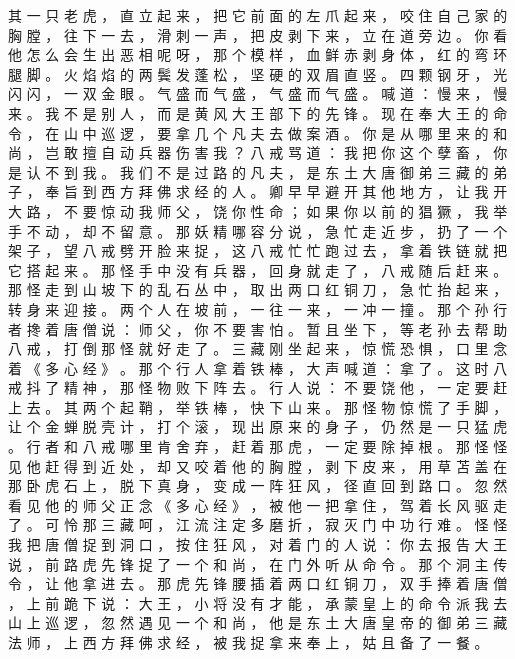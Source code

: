 {其 一 只 老 虎 ， 直 立 起 来 ， 把 它 前 面 的 左 爪 起 来 ， 咬 住 自 己 家 的 胸 膛 ， 往 下 一 去 ， 滑 刺 一 声 ， 把 皮 剥 下 来 ， 立 在 道 旁 边 。
你 看 他 怎 么 会 生 出 恶 相 呢 呀 ， 那 个 模 样 ， 血 鲜 赤 剥 身 体 ， 红 的 弯 环 腿 脚 。
火 焰 焰 的 两 鬓 发 蓬 松 ， 坚 硬 的 双 眉 直 竖 。
四 颗 钢 牙 ， 光 闪 闪 ， 一 双 金 眼 。
气 盛 而 气 盛 ， 气 盛 而 气 盛 。
喊 道 ： 慢 来 ， 慢 来 。
我 不 是 别 人 ， 而 是 黄 风 大 王 部 下 的 先 锋 。
现 在 奉 大 王 的 命 令 ， 在 山 中 巡 逻 ， 要 拿 几 个 凡 夫 去 做 案 酒 。
你 是 从 哪 里 来 的 和 尚 ， 岂 敢 擅 自 动 兵 器 伤 害 我 ？ 八 戒 骂 道 ： 我 把 你 这 个 孽 畜 ， 你 是 认 不 到 我 。
我 们 不 是 过 路 的 凡 夫 ， 是 东 土 大 唐 御 弟 三 藏 的 弟 子 ， 奉 旨 到 西 方 拜 佛 求 经 的 人 。
卿 早 早 避 开 其 他 地 方 ， 让 我 开 大 路 ， 不 要 惊 动 我 师 父 ， 饶 你 性 命 ； 如 果 你 以 前 的 猖 獗 ， 我 举 手 不 动 ， 却 不 留 意 。
那 妖 精 哪 容 分 说 ， 急 忙 走 近 步 ， 扔 了 一 个 架 子 ， 望 八 戒 劈 开 脸 来 捉 ， 这 八 戒 忙 忙 跑 过 去 ， 拿 着 铁 链 就 把 它 搭 起 来 。
那 怪 手 中 没 有 兵 器 ， 回 身 就 走 了 ， 八 戒 随 后 赶 来 。 那 怪 走 到 山 坡 下 的 乱 石 丛 中 ， 取 出 两 口 红 铜 刀 ， 急 忙 抬 起 来 ， 转 身 来 迎 接 。
两 个 人 在 坡 前 ， 一 往 一 来 ， 一 冲 一 撞 。
那 个 孙 行 者 搀 着 唐 僧 说 ： 师 父 ， 你 不 要 害 怕 。
暂 且 坐 下 ， 等 老 孙 去 帮 助 八 戒 ， 打 倒 那 怪 就 好 走 了 。
三 藏 刚 坐 起 来 ， 惊 慌 恐 惧 ， 口 里 念 着 《 多 心 经 》 。
那 个 行 人 拿 着 铁 棒 ， 大 声 喊 道 ： 拿 了 。 这 时 八 戒 抖 了 精 神 ， 那 怪 物 败 下 阵 去 。
行 人 说 ： 不 要 饶 他 ， 一 定 要 赶 上 去 。
其 两 个 起 鞘 ， 举 铁 棒 ， 快 下 山 来 。
那 怪 物 惊 慌 了 手 脚 ， 让 个 金 蝉 脱 壳 计 ， 打 个 滚 ， 现 出 原 来 的 身 子 ， 仍 然 是 一 只 猛 虎 。
行 者 和 八 戒 哪 里 肯 舍 弃 ， 赶 着 那 虎 ， 一 定 要 除 掉 根 。
那 怪 怪 见 他 赶 得 到 近 处 ， 却 又 咬 着 他 的 胸 膛 ， 剥 下 皮 来 ， 用 草 苫 盖 在 那 卧 虎 石 上 ， 脱 下 真 身 ， 变 成 一 阵 狂 风 ， 径 直 回 到 路 口 。
忽 然 看 见 他 的 师 父 正 念 《 多 心 经 》 ， 被 他 一 把 拿 住 ， 驾 着 长 风 驱 走 了 。
可 怜 那 三 藏 呵 ， 江 流 注 定 多 磨 折 ， 寂 灭 门 中 功 行 难 。
怪 怪 我 把 唐 僧 捉 到 洞 口 ， 按 住 狂 风 ， 对 着 门 的 人 说 ： 你 去 报 告 大 王 说 ， 前 路 虎 先 锋 捉 了 一 个 和 尚 ， 在 门 外 听 从 命 令 。
那 个 洞 主 传 令 ， 让 他 拿 进 去 。
那 虎 先 锋 腰 插 着 两 口 红 铜 刀 ， 双 手 捧 着 唐 僧 ， 上 前 跪 下 说 ： 大 王 ， 小 将 没 有 才 能 ， 承 蒙 皇 上 的 命 令 派 我 去 山 上 巡 逻 ， 忽 然 遇 见 一 个 和 尚 ， 他 是 东 土 大 唐 皇 帝 的 御 弟 三 藏 法 师 ， 上 西 方 拜 佛 求 经 ， 被 我 捉 拿 来 奉 上 ， 姑 且 备 了 一 餐 。
}
